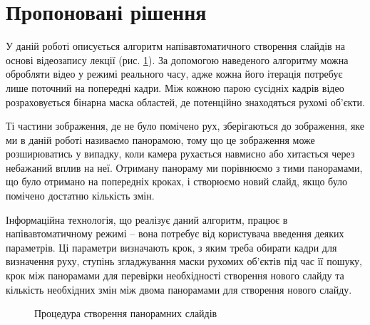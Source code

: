 \section{Пропоновані рішення}


У даній роботі описується алгоритм напівавтоматичного 
створення слайдів на основі відеозапису лекції (рис. \ref{fig:pipeline}).
За допомогою наведеного алгоритму можна обробляти відео 
у режимі реального часу, адже кожна його ітерація потребує 
лише поточний на попередні кадри. Між кожною парою 
сусідніх кадрів відео розраховується бінарна маска областей, де 
потенційно знаходяться рухомі об’єкти. 


Ті частини зображення, де не було помічено рух, зберігаються до 
зображення, яке ми в даній роботі називаємо панорамою, тому що 
це зображення може розширюватись у випадку, коли камера рухається 
навмисно або хитається через небажаний вплив на неї. 
Отриману панораму ми порівнюємо з тими панорамами, що було отримано на 
попередніх кроках, і створюємо новий слайд, якщо було помічено 
достатню кількість змін.


Інформаційна технологія, що реалізує даний алгоритм, працює в 
напівавтоматичному режимі – вона потребує від користувача введення 
деяких параметрів. 
Ці параметри визначають крок, з яким треба обирати кадри для визначення руху, 
ступінь згладжування маски рухомих об’єктів під час її пошуку, крок 
між панорамами для перевірки необхідності створення нового 
слайду та кількість необхідних змін між двома панорамами для створення нового слайду.



\usetikzlibrary{arrows,positioning,shapes}
\begin{figure}
\begin{center}
\end{center}
\caption{Процедура створення панорамних слайдів
\label{fig:pipeline}
}
\end{figure}